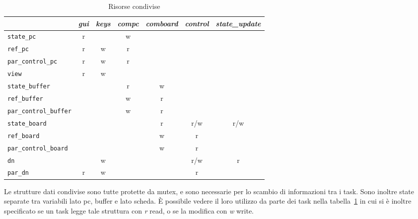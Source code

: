 
\begin{table}[]
	\centering
	\begin{tabular}{l|c|c|c|c|c|c}
		& \textit{gui} & \textit{keys} & \textit{compc} & \textit{comboard} & \textit{control} & \textit{state\_update} \\ \hline
		\texttt{state\_pc}		              & r   &      & w     &          &         &               \\ \hline
		\texttt{ref\_pc}             		  & r   & w    & r     &          &         &               \\ \hline
		\texttt{par\_control\_pc}              & r   & w    & r     &          &         &               \\ \hline
		\texttt{view }                         & r   & w    &       &          &         &               \\ \hline
		\texttt{state\_buffer}                 &     &      & r     & w        &         &               \\ \hline
		\texttt{ref\_buffer}                   &     &      & w     & r        &         &               \\ \hline 
		\texttt{par\_control\_buffer}		  &     &      & w     & r        &         &               \\ \hline
		\texttt{state\_board}                  &     &      &       & r        & r/w     & r/w           \\ \hline
		\texttt{ref\_board}                    &     &      &       & w        & r       &               \\ \hline
		\texttt{par\_control\_board}           &     &      &       & w        & r       &               \\ \hline
		\texttt{dn}                            &     & w     &       &          & r/w     & r             \\ \hline
		\texttt{par\_dn}                       & r   & w    &       &          & r       &               \\ \hline
	\end{tabular}
	\caption{Risorse condivise}
	\label{tab:risorse_task}
\end{table}

Le strutture dati condivise sono tutte protette da mutex, e sono necessarie per lo scambio di informazioni tra i task. Sono inoltre state separate tra variabili lato pc, buffer e lato scheda. \`E possibile vedere il loro utilizzo da parte dei task nella tabella~\ref{tab:risorse_task} in cui si \`e inoltre specificato se un task legge tale struttura con \textit{r} read, o se la modifica con \textit{w} write.

